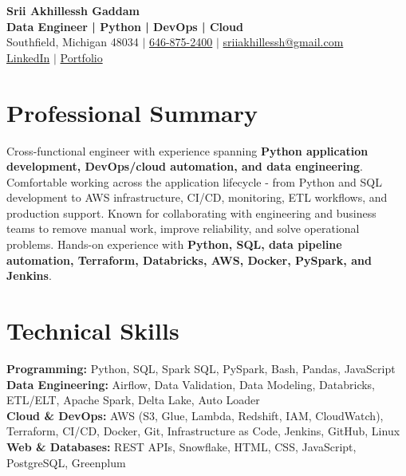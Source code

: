 \documentclass[letterpaper,10pt]{article}
\begin{document}
\fontsize{9.35pt}{10.45pt}\selectfont

\begin{center}
    {\LARGE \textbf{Srii Akhillessh Gaddam}} \\[-1pt]
    \textbf{Data Engineer | Python | DevOps | Cloud} \\[2pt]
    Southfield, Michigan 48034 $|$
    \href{tel:6468752400}{646-875-2400} $|$
    \href{mailto:sriiakhillessh@gmail.com}{sriiakhillessh@gmail.com} \\[1pt]
    \href{https://www.linkedin.com/in/srii-akhiilessh-gaddam-b48668191/}{LinkedIn} $|$
    \href{https://sriiakhillesshg.github.io/portfolio/}{Portfolio}
\end{center}
\vspace{-8pt}

\section{Professional Summary}
\small{Cross-functional engineer with experience spanning \textbf{Python application development, DevOps/cloud automation, and data engineering}. Comfortable working across the application lifecycle - from Python and SQL development to AWS infrastructure, CI/CD, monitoring, ETL workflows, and production support. Known for collaborating with engineering and business teams to remove manual work, improve reliability, and solve operational problems. Hands-on experience with \textbf{Python, SQL, data pipeline automation, Terraform, Databricks, AWS, Docker, PySpark, and Jenkins}.}

\section{Technical Skills}
\small{
\textbf{Programming:} Python, SQL, Spark SQL, PySpark, Bash, Pandas, JavaScript \\
\textbf{Data Engineering:} Airflow, Data Validation, Data Modeling, Databricks, ETL/ELT, Apache Spark, Delta Lake, Auto Loader \\
\textbf{Cloud \& DevOps:} AWS (S3, Glue, Lambda, Redshift, IAM, CloudWatch), Terraform, CI/CD, Docker, Git, Infrastructure as Code, Jenkins, GitHub, Linux \\
\textbf{Web \& Databases:} REST APIs, Snowflake, HTML, CSS, JavaScript, PostgreSQL, Greenplum
}
\end{document}

